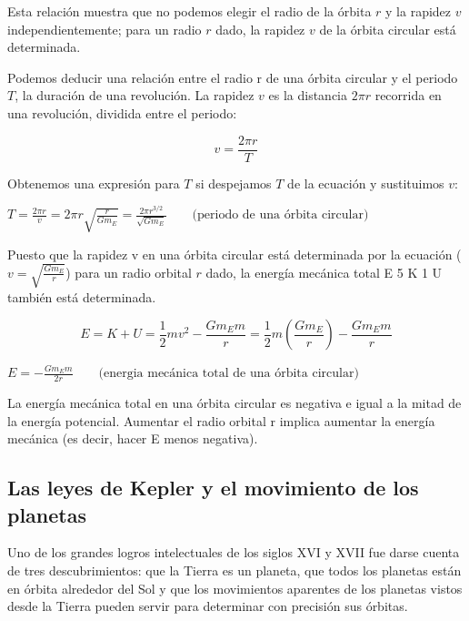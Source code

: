 \documentclass{article}
\newcommand{\newsubsection}[1]{
    \vspace{0.5cm}
    \color{sectionColor}
    \subsection{\bl{#1}}
    \color{black}
    \vspace{0.5cm}
}
\newcommand{\bl}[1]{\textbf{#1}}
\newcommand{\definicion}[1]{%
    \vspace{0.5cm}
    \begin{definicionbox}
        #1
    \end{definicionbox}
    \vspace{0.5cm}
}
\begin{document}
    \par Esta relación muestra que no podemos elegir el radio de la órbita $r$ y la rapidez $v$ independientemente; para un radio $r$ dado, la rapidez $v$ de la órbita circular está determinada.

    \par Podemos deducir una relación entre el radio r de una órbita circular y el periodo $T$, la duración de una revolución. La rapidez $v$ es la distancia $2 \pi r$ recorrida en una revolución, dividida entre el periodo:

    \[ v = \frac{2 \pi r}{T} \]

    \par Obtenemos una expresión para $T$ si despejamos $T$ de la ecuación y sustituimos $v$:

    \definicion{
        \centering
        \( T = \frac{2 \pi r}{v} = 2 \pi r \sqrt{\frac{r}{G m_E}} = \frac{2 \pi r^{3/2}}{\sqrt{G m_E}} \quad \quad \text{(periodo de una órbita circular)} \)
    }

    \pagebreak

    \par Puesto que la rapidez v en una órbita circular está determinada por la ecuación ($v = \sqrt{\frac{G m_E}{r}}$) para un radio orbital $r$ dado, la energía mecánica total E 5 K 1 U también está determinada.

    \[ E = K + U = \frac{1}{2} m v^2 - \frac{G m_E m}{r} = \frac{1}{2} m \left( \frac{G m_E}{r} \right) - \frac{G m_E m}{r} \]

    \definicion{
        \centering
        \( E = - \frac{G m_E m}{2r} \quad \quad \text{(energia mecánica total de una órbita circular)} \)
    }

    \par La energía mecánica total en una órbita circular es negativa e igual a la mitad de la energía potencial. Aumentar el radio orbital r implica aumentar la energía mecánica (es decir, hacer E menos negativa).

    \newsubsection{Las leyes de Kepler y el movimiento de los planetas}

    \par Uno de los grandes logros intelectuales de los siglos XVI y XVII fue darse cuenta de tres descubrimientos: que la Tierra es un planeta, que todos los planetas están en órbita alrededor del Sol y que los movimientos aparentes de los planetas vistos desde la Tierra pueden servir para determinar con precisión sus órbitas.

    \vspace{0.2cm}
\end{document}
